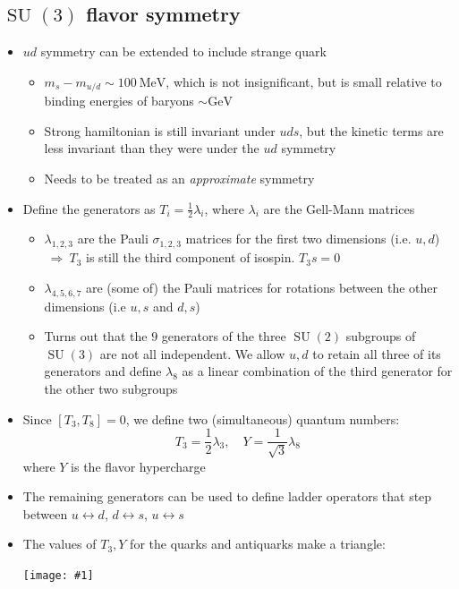 \documentclass[11pt]{article}
\DeclareMathOperator{\SU}{SU}
\newcommand{\gev}{\text{GeV}}
\newcommand{\mev}{\text{MeV}}
\newcommand{\thus}{\ensuremath{~\Rightarrow~}}
\newcommand{\embedimgw}[2]{\begin{center}\texttt{[image: \#1]}\end{center}}
\begin{document}
\subsection{$\SU(3)$ flavor symmetry}
\begin{itemize}
  \item $ud$ symmetry can be extended to include strange quark
  \begin{itemize}
    \item $m_s - m_{u/d}\sim100~\mev$, which is not insignificant, but is small relative to binding energies of baryons $\sim\gev$
    \item Strong hamiltonian is still invariant under $uds$, but the kinetic terms are less invariant than they were under the $ud$ symmetry
    \item Needs to be treated as an \emph{approximate} symmetry
  \end{itemize}
  \item Define the generators as $T_i = \frac{1}{2}\lambda_i$, where $\lambda_i$ are the Gell-Mann matrices
  \begin{itemize}
    \item $\lambda_{1,2,3}$ are the Pauli $\sigma_{1,2,3}$ matrices for the first two dimensions (i.e. $u,d$)\thus $T_3$ is still the third component of isospin. $T_3s = 0$
    \item $\lambda_{4,5,6,7}$ are (some of) the Pauli matrices for rotations between the other dimensions (i.e $u,s$ and $d,s$)
    \item Turns out that the $9$ generators of the three $\SU(2)$ subgroups of $\SU(3)$ are not all independent. We allow $u,d$ to retain all three of its generators and define $\lambda_8$ as a linear combination of the third generator for the other two subgroups
  \end{itemize}
  \item Since $[T_3,T_8]=0$, we define two (simultaneous) quantum numbers:
  \begin{equation}
    T_3 = \frac{1}{2}\lambda_3,\quad Y = \frac{1}{\sqrt3}\lambda_8
  \end{equation}
  where $Y$ is the flavor hypercharge
  \item The remaining generators can be used to define ladder operators that step between $u\leftrightarrow d$, $d\leftrightarrow s$, $u\leftrightarrow s$
  \item The values of $T_3,Y$ for the quarks and antiquarks make a triangle:
  \embedimgw{figs/su3_t3y.png}{.6}
\end{itemize}
\end{document}
